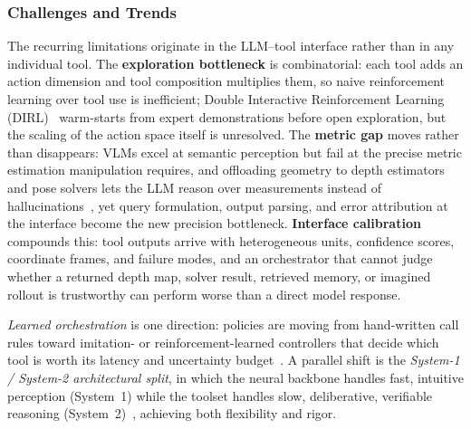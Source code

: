 \subsubsection{Challenges and Trends}
The recurring limitations originate in the LLM--tool interface rather than in any individual tool.
The \textbf{exploration bottleneck} is combinatorial: each tool adds an action dimension and tool composition multiplies them, so naive reinforcement learning over tool use is inefficient; Double Interactive Reinforcement Learning (DIRL)~\cite{chen2025spacetools} warm-starts from expert demonstrations before open exploration, but the scaling of the action space itself is unresolved.
The \textbf{metric gap} moves rather than disappears: VLMs excel at semantic perception but fail at the precise metric estimation manipulation requires, and offloading geometry to depth estimators and pose solvers lets the LLM reason over measurements instead of hallucinations~\cite{chen2025spacetools,zhang2025scaling}, yet query formulation, output parsing, and error attribution at the interface become the new precision bottleneck.
\textbf{Interface calibration} compounds this: tool outputs arrive with heterogeneous units, confidence scores, coordinate frames, and failure modes, and an orchestrator that cannot judge whether a returned depth map, solver result, retrieved memory, or imagined rollout is trustworthy can perform worse than a direct model response.

\emph{Learned orchestration} is one direction: policies are moving from hand-written call rules toward imitation- or reinforcement-learned controllers that decide which tool is worth its latency and uncertainty budget~\cite{chen2025spacetools}.
A parallel shift is the \emph{System-1 / System-2 architectural split}, in which the neural backbone handles fast, intuitive perception (System~1) while the toolset handles slow, deliberative, verifiable reasoning (System~2)~\cite{yang2025neurosymbo}, achieving both flexibility and rigor.
